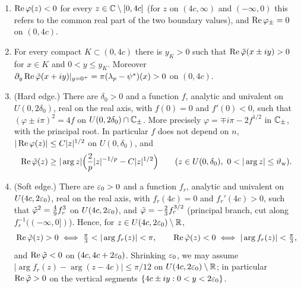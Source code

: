 \begin{lemma}\label{lem:signs}
\begin{enumerate}
\item[(i)] $\operatorname{Re}\varphi(z)<0$ for every $z\in\mathbb{C}\setminus[0,4c]$ (for $z$ on $(4c,\infty)$ and $(-\infty,0)$ this
  refers to the common real part of the two boundary values), and $\operatorname{Re}\varphi_\pm=0$ on $(0,4c)$.
\item[(ii)] For every compact $K\subset(0,4c)$ there is $y_K>0$ such that $\operatorname{Re}\tilde\varphi(x\pm iy)>0$ for $x\in K$ and
  $0<y\le y_K$. Moreover $\partial_y\operatorname{Re}\tilde\varphi(x+iy)|_{y=0^+}=\pi(\lambda_p-\psi^*)(x)>0$ on $(0,4c)$.
\item[(iii)] (Hard edge.) There are $\delta_0>0$ and a function $f$, analytic and univalent on $U(0,2\delta_0)$,
  real on the real axis, with $f(0)=0$ and $f'(0)<0$, such that $(\varphi\pm i\pi)^2=4f$ on $U(0,2\delta_0)\cap\mathbb{C}_\pm$.
  More precisely $\varphi=\mp i\pi-2f^{1/2}$ in $\mathbb{C}_\pm$, with the principal root. In particular $f$ does not
  depend on $n$, $|\operatorname{Re}\varphi(z)|\le C|z|^{1/2}$ on $U(0,\delta_0)$, and
  \begin{equation}\label{eq:retvphi-zero}
    \re\tvphi(z)\ge|\arg z|\Bigl(\frac2p|z|^{-1/p}-C|z|^{1/2}\Bigr)\qquad(z\in U(0,\delta_0),\ 0<|\arg z|\le\thw).
  \end{equation}
\item[(iv)] (Soft edge.) There are $\varepsilon_0>0$ and a function $f_r$, analytic and univalent on $U(4c,2\varepsilon_0)$, real
  on the real axis, with $f_r(4c)=0$ and $f_r'(4c)>0$, such that $\tilde\varphi^2=\frac49f_r^3$ on $U(4c,2\varepsilon_0)$, and
  $\tilde\varphi=-\frac23f_r^{3/2}$ (principal branch, cut along $f_r^{-1}((-\infty,0])$). Hence, for
  $z\in U(4c,2\varepsilon_0)\setminus\mathbb{R}$,
  \[
    \re\tvphi(z)>0\iff\tfrac\pi3<|\arg f_r(z)|<\pi,\qquad \re\tvphi(z)<0\iff|\arg f_r(z)|<\tfrac\pi3 ,
  \]
  and $\operatorname{Re}\tilde\varphi<0$ on $(4c,4c+2\varepsilon_0)$. Shrinking $\varepsilon_0$, we may assume $|\arg f_r(z)-\arg(z-4c)|\le\pi/12$ on
  $U(4c,2\varepsilon_0)\setminus\mathbb{R}$; in particular $\operatorname{Re}\tilde\varphi>0$ on the vertical segments $\{4c\pm iy:0<y<2\varepsilon_0\}$.
\end{enumerate}
\end{lemma}

